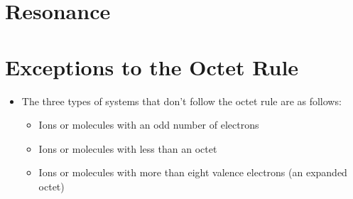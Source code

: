 \documentclass[
	chapter=9,
	title={Basic Concepts of Chemical Bonding},
	showanswers=true,
]{chem122notes}
\begin{document}
\section{Resonance}\label{sec:resonance}

\section{Exceptions to the Octet Rule}\label{sec:exceptions-to-the-octet-rule}
\begin{itemize}
	\item The three types of systems that don't follow the octet rule are as follows:
	\begin{itemize}
		\item Ions or molecules with an odd number of electrons
		\item Ions or molecules with less than an octet
		\item Ions or molecules with more than eight valence electrons (an expanded octet)
	\end{itemize}
\end{itemize}
\end{document}
